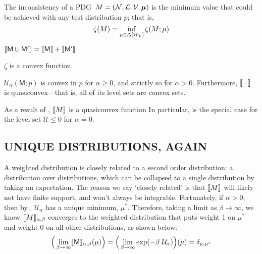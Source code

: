\documentclass{article}
\newcommand{\bmu}{\boldsymbol{\mu}}
\newcommand{\sfM}{\mathsf M}
\newcommand{\MN}{PDG}
\numberwithin{equation}{section}
\begin{document}
	\begin{defn}\label{def:cont-inconsist}
		The inconsistency of a \MN\ $M = (\cal N, L, V, \bmu)$ is the minimum value that could be achieved with any test distribution $p$; that is, 
		\[ \zeta(M) = \inf_{ \mu \in \Delta [W_{\cal V}]} \zeta (M; \mu) 
		\]		
	\end{defn}
	\begin{prop}[name=\Cref{prop:union-set-semantics} analog]\label{prop:union-weight-semantics}
		$\bbr{\sfM \cup \sfM'} = \bbr{\sfM} + \bbr{\sfM'}$
	\end{prop}
	\begin{lemma}[name=\Cref{prop:convex} analog, restate=thmzetaconvex]\label{thm:zetaconvex}
		$\zeta$ is a convex function. %
	\end{lemma}
	\begin{coro}\label{cor:u-convex}
		$\mathcal{U}_\alpha(\sfM; p)$ is convex in $p$ for $\alpha \geq 0$, and strictly so for $\alpha> 0$. Furthermore, $\llbracket-\rrbracket$ is quasiconvex---that is, all of its level sets are convex sets.
	\end{coro}

	As a result of , $\llbracket M\rrbracket$ is a quasiconvex function 
	In particular,  is the special case for the level set $\mathcal U \leq 0$ for $\alpha = 0$. 
	

	\subsection{UNIQUE DISTRIBUTIONS, AGAIN}\label{sec:uniq-dist-semantics-2}
	
	A weighted distribution is closely related to a second order distribution: a distribution over distributions, which can be collapsed to a single distribution by taking an expectation.
	The reason we say `closely related' is that $\llbracket M\rrbracket$ will likely not have finite support, and won't always be integrable. Fortunately, if $\alpha > 0$, then by , $\mathcal U_\alpha$ has a unique minimum, $\mu^*$. Therefore, taking a limit as $\beta \to \infty$, we know $\llbracket M\rrbracket_{\alpha,\beta}$ converges to the weighted distribution that puts weight 1 on $\mu^*$ and weight 0 on all other distributions, as shown below:
	\[ \Big(\lim_{\beta \to \infty} \bbr{\sfM}_{\alpha,\beta}(\mu) \Big)  = \Big(\lim_{\beta \to \infty} \exp(-\beta\ \mathcal U_\alpha) \Big)(\mu) = \delta_{\mu, \mu^*} \]
	
\end{document}
